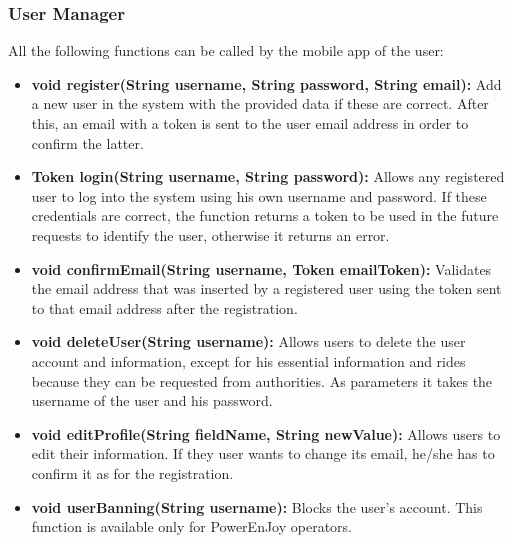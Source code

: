 \subsubsection{User Manager}
All the following functions can be called by the mobile app of the user:
\begin{itemize}
	\item \textbf{void register(String username, String password, String email):} Add a new user in the system with the provided data if these are correct.
	After this, an email with a token is sent to the user email address in order to confirm the latter.
    \item \textbf{Token login(String username, String password):} Allows any registered user to log into the system using his own username and password.
    If these credentials are correct, the function returns a token to be used in the future requests to identify the user, otherwise it returns an error.
    \item \textbf{void confirmEmail(String username, Token emailToken):} Validates the email address that was inserted by a registered user using the token sent to that email address after the registration.
    \item \textbf{void deleteUser(String username):} Allows users to delete the user account and information, except for his essential information and rides because they can be requested from authorities. As parameters it takes the username of the user and his password.
	\item \textbf{void editProfile(String fieldName, String newValue):} Allows users to edit their information. If they user wants to change its email, he/she has to confirm it as for the registration.
	\item \textbf{void userBanning(String username):} Blocks the user's account.%
	This function is available only for PowerEnJoy operators.

\end{itemize}

